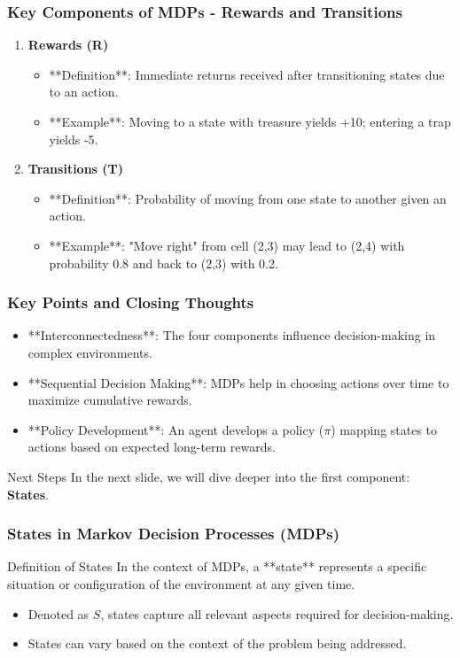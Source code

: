 \documentclass{beamer}
\begin{document}
\begin{frame}[fragile]
    \frametitle{Key Components of MDPs - Rewards and Transitions}
    \begin{enumerate}[resume]
        \item \textbf{Rewards (R)}
        \begin{itemize}
            \item **Definition**: Immediate returns received after transitioning states due to an action.
            \item **Example**: Moving to a state with treasure yields +10; entering a trap yields -5.
        \end{itemize}
        
        \item \textbf{Transitions (T)}
        \begin{itemize}
            \item **Definition**: Probability of moving from one state to another given an action.
            \item **Example**: "Move right" from cell (2,3) may lead to (2,4) with probability 0.8 and back to (2,3) with 0.2.
        \end{itemize}
    \end{enumerate}
\end{frame}

\begin{frame}[fragile]
    \frametitle{Key Points and Closing Thoughts}
    \begin{itemize}
        \item **Interconnectedness**: The four components influence decision-making in complex environments.
        \item **Sequential Decision Making**: MDPs help in choosing actions over time to maximize cumulative rewards.
        \item **Policy Development**: An agent develops a policy ($\pi$) mapping states to actions based on expected long-term rewards.
    \end{itemize}
    
    \begin{block}{Next Steps}
        In the next slide, we will dive deeper into the first component: \textbf{States}.
    \end{block}
\end{frame}

\begin{frame}[fragile]
    \frametitle{States in Markov Decision Processes (MDPs)}
    \begin{block}{Definition of States}
        In the context of MDPs, a **state** represents a specific situation or configuration of the environment at any given time.
    \end{block}
    \begin{itemize}
        \item Denoted as \( S \), states capture all relevant aspects required for decision-making.
        \item States can vary based on the context of the problem being addressed.
    \end{itemize}
\end{frame}
\end{document}
